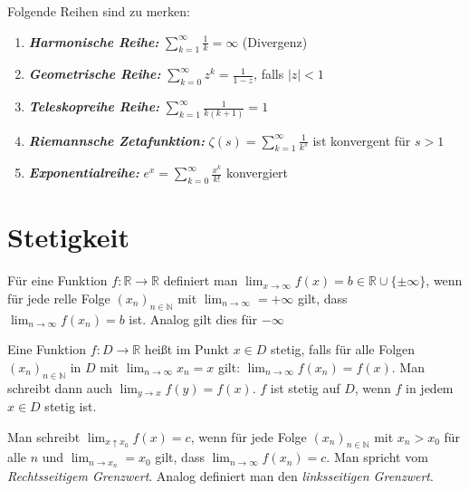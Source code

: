 \documentclass[]{article}
\begin{document}
\begin{satz}
	Folgende Reihen sind zu merken:
	\begin{enumerate}[noitemsep]
	\item \emph{\textbf{Harmonische Reihe:}} $\sum_{k=1}^{\infty} \frac{1}{k} = \infty$ (Divergenz)
	\item \emph{\textbf{Geometrische Reihe:}} $\sum_{k=0}^{\infty} z^k = \frac{1}{1 - z}$, falls $|z| < 1$
	\item \emph{\textbf{Teleskopreihe Reihe:}}  $\sum_{k=1}^{\infty} \frac{1}{k(k+1)} = 1$
	\item \emph{\textbf{Riemannsche Zetafunktion:}} $\zeta(s) = \sum_{k=1}^{\infty} \frac{1}{k^s}$ ist konvergent für $s>1$	
	\item \emph{\textbf{Exponentialreihe:}} $e^x = \sum_{k=0}^{\infty} \frac{x^k}{k!}$ konvergiert	
\end{enumerate}
\end{satz}

\section{Stetigkeit}
\begin{definition}
	Für eine Funktion $f : \mathbb{R} \rightarrow \mathbb{R}$ definiert man $\lim_{x \rightarrow \infty} f(x) = b \in \mathbb{R} \cup \{\pm \infty\}$, wenn für jede relle Folge $(x_n)_{n \in \mathbb{N}}$ mit $\lim_{n \rightarrow \infty} = + \infty$ gilt, dass $\lim_{n \rightarrow \infty} f(x_n) = b$ ist. Analog gilt dies für $- \infty$
\end{definition}

\begin{definition}[Stetigkeit]
	Eine Funktion $f : D \rightarrow \mathbb{R}$ heißt im Punkt $x \in D$ stetig, falls für alle Folgen $(x_n)_{n \in \mathbb{N}}$ in $D$ mit $\lim_{n \rightarrow \infty} x_n = x$ gilt: $\lim_{n \rightarrow \infty} f(x_n) = f(x)$. Man schreibt dann auch $\lim_{y \rightarrow x} f(y) = f(x)$. $f$ ist stetig auf $D$, wenn $f$ in jedem $x \in D$ stetig ist. 
\end{definition}

\begin{definition}
	Man schreibt $\lim_{x \uparrow x_0} f(x) = c$, wenn für jede Folge $(x_n)_{n \in \mathbb{N}}$ mit $x_n > x_0$ für alle $n$ und $\lim_{n \rightarrow x_n} = x_0$ gilt, dass $\lim_{n \rightarrow \infty} f(x_n) = c$. Man spricht vom \emph{Rechtsseitigem Grenzwert}. Analog definiert man den \emph{linksseitigen Grenzwert}.
\end{definition}
\end{document}
